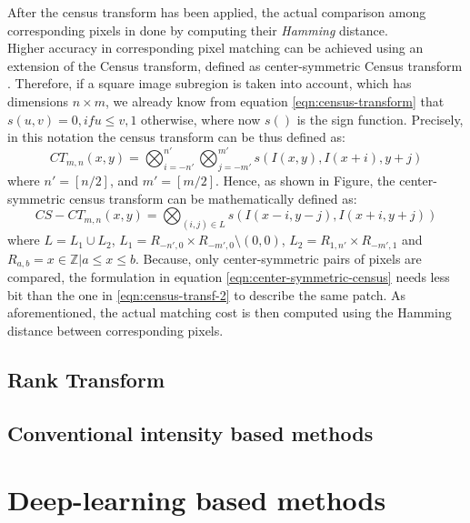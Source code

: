 After the census transform has been applied, the actual comparison among corresponding pixels in done by computing their \textit{Hamming} distance.\\ 
Higher accuracy in corresponding pixel matching can be achieved using an extension of the Census transform, defined as center-symmetric Census transform \cite{Spangenberg2013}.
Therefore, if a square image subregion is taken into account, which has dimensions $n \times m$, we already know from equation \ref{eqn:census-transform} that $s(u, v) = 0, if u \leq v, 1$ otherwise, where now $s( )$ is the sign function.
Precisely, in this notation the census transform can be thus defined as:
\begin{equation}
	\label{eqn:census-transf-2}
	CT_{m,n}(x, y) = \bigotimes_{i = -n'}^{n'} \bigotimes_{j = -m'}^{m'} s(I(x, y), I(x + i), y + j)
\end{equation}
where $n' = [n/2]$, and $m' = [m/2]$.
Hence, as shown in Figure, the center-symmetric census transform can be mathematically defined as:
\begin{equation}
	\label{eqn:center-symmetric-census}
	CS-CT_{m,n}(x, y) = \bigotimes_{(i, j) \in L} s(I(x - i, y - j), I(x + i, y + j))
\end{equation}
where $L = L_1 \cup L_2$, $L_1 = R_{-n',0} \times R_{-m',0} \setminus {(0, 0)}$, $L_2 = R_{1,n'} \times R_{-m',1}$ and $R_{a, b} = {x \in \mathbb{Z} \vert a \leq x \leq b}$.
Because, only center-symmetric pairs of pixels are compared, the formulation in equation \ref{eqn:center-symmetric-census} needs less bit than the one in \ref{eqn:census-transf-2} to describe the same patch. 
As aforementioned, the actual matching cost is then computed using the Hamming distance between corresponding pixels. 

\subsection{Rank Transform}
\label{subsection:rank-transform}

\subsection{Conventional intensity based methods}
\label{subsection:conventional-methods}

\section{Deep-learning based methods}
\label{section:deep-learning-method}

